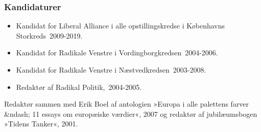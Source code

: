 \documentclass[11pt, a4paper]{awesome-cv}
\begin{document}
\begin{cvletter}
\subsubsection*{Kandidaturer}
\begin{itemize}
\item Kandidat for Liberal Alliance i alle opstillingskredse i Københavns Storkreds 2009-2019.
\item Kandidat for Radikale Venstre i Vordingborgkredsen 2004-2006.
\item Kandidat for Radikale Venstre i Næstvedkredsen 2003-2008.
\end{itemize}
\begin{itemize}
\item Redaktør af Radikal Politik, 2004-2005.
\end{itemize}
Redaktør sammen med Erik Boel af antologien »Europa i alle palettens farver &ndash; 11 essays om europæiske værdier«, 2007 og redaktør af jubilæumsbogen »Tidens Tanker«, 2001.

\end{cvletter}
\end{document}
